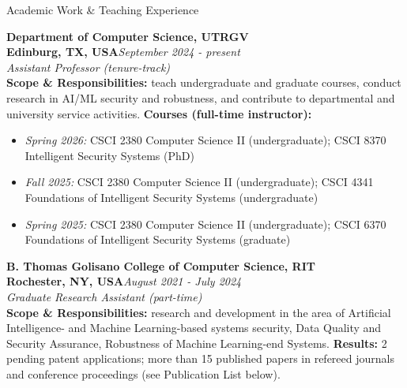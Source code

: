 \documentclass[10pt]{resume} %
\begin{document}
\vspace{-0.3cm}
\begin{rSection}{Academic Work \& Teaching Experience}



\textbf{Department of Computer Science, UTRGV}\\
\textbf{Edinburg, TX, USA}\hfill\small{\em September 2024 - present}\normalsize\\
{\em Assistant Professor (tenure-track)}
\\\textbf{Scope \& Responsibilities:} teach undergraduate and graduate courses, conduct research in AI/ML security and robustness, and contribute to departmental and university service activities. \textbf{Courses (full-time instructor):}
\begin{itemize}
\itemsep-0.5em
    \item \textit{Spring 2026:} CSCI 2380 Computer Science II (undergraduate); CSCI 8370 Intelligent Security Systems (PhD)
    \item \textit{Fall 2025:} CSCI 2380 Computer Science II (undergraduate); CSCI 4341 Foundations of Intelligent Security Systems (undergraduate)
    \item \textit{Spring 2025:} CSCI 2380 Computer Science II (undergraduate); CSCI 6370 Foundations of Intelligent Security Systems (graduate)
\end{itemize}



\textbf{B. Thomas Golisano College of Computer Science, RIT}\\
\textbf{Rochester, NY, USA}\hfill\small{\em August 2021 - July 2024}\normalsize\\
{\em Graduate Research Assistant (part-time)}
\\\textbf{Scope \& Responsibilities:} research and development in the area of Artificial Intelligence- and Machine Learning-based systems security, Data Quality and Security Assurance, Robustness of Machine Learning-end Systems. \textbf{Results:} 2 pending patent applications; more than 15 published papers in refereed journals and conference proceedings (see Publication List below).


\end{rSection}
\end{document}
